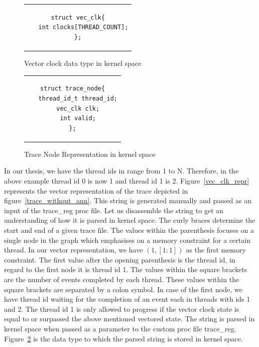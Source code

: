 \begin{figure}[h]
\centering
\begin{tabular}{c}
\begin{lstlisting}
struct vec_clk{
   int clocks[THREAD_COUNT];
};
\end{lstlisting}
\end{tabular}
\caption{Vector clock data type in kernel space}
\label{vec_clk_datatype}
\end{figure}

\begin{figure}[h]
\centering
\begin{tabular}{c}
\begin{lstlisting}
struct trace_node{
   thread_id_t thread_id;
   vec_clk clk;
   int valid;
};
\end{lstlisting}
\end{tabular}
\caption{Trace Node Representation in kernel space}
\label{trace_node_datatype}
\end{figure}



In our thesis, we have the thread ids in range from 1 to N. 
Therefore, in the above example thread id 0 is now 1 and thread id 1 is 2. 
Figure~\ref{vec_clk_repr} represents the vector representation of the trace depicted in figure~\ref{trace_without_ann}. 
This string is generated manually and passed as an input of the trace\_reg proc file. 
Let us disassemble the string to get an understanding of how it is parsed in kernel space. 
The curly braces determine the start and end of a given trace file. 
The values within the parenthesis focuses on a single node in the graph which emphasises on a memory constraint for a certain thread. 
In our vector representation, we have $(1,[1:1])$ as the first memory constraint. 
The first value after the opening parenthesis is the thread id, in regard to the first node it is thread id 1. 
The values within the square brackets are the number of events completed by each thread. 
These values within the square brackets are separated by a colon symbol. 
In case of the first node, we have thread id waiting for the completion of an event each in threads with ids 1 and 2. 
The thread id 1 is only allowed to progress if the vector clock state is equal to or surpassed the above mentioned vectored state. 
The string is parsed in kernel space when passed as a parameter to the custom proc file trace\_reg. 
Figure~\ref{trace_node_datatype} is the data type to which the parsed string is stored in kernel space. 

